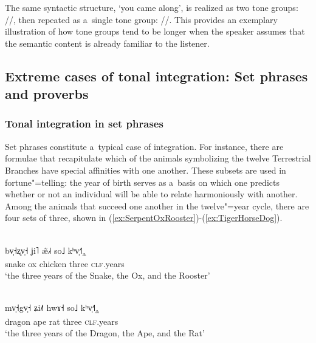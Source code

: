 The same syntactic structure, ‘you came along’, is realized as
two tone groups: //, then repeated as a~single tone group:
//. This provides an exemplary illustration of how tone groups tend to be longer when the speaker assumes that the semantic content is already familiar
to the listener.




\subsection[Extreme cases of tonal integration]{Extreme cases of tonal integration: Set phrases and proverbs}
\label{sec:extremecasesoftonalintegrationsetphrasesandproverbs}



\subsubsection{Tonal integration in set phrases}
\label{sec:tonalintegrationinsetphrases}

Set phrases constitute a~typical case of integration. For instance, there are formulae that recapitulate which of the animals symbolizing the twelve Terrestrial Branches have special affinities with one another. These subsets are used in fortune"=telling: the year of birth serves as a~basis on which one predicts whether or not an individual will be able to relate harmoniously with another. Among the animals that succeed one another in the twelve"=year cycle, there are four sets of three, shown in (\ref{ex:SerpentOxRooster})-(\ref{ex:TigerHorseDog}).

\begin{exe}
	\ex
	\label{ex:SerpentOxRooster}
	\\
	\gll bv̩˧ʐv̩˧	ʝi˥	æ̃˩˧	so˩		kʰv̩˧˥\textsubscript{a}\\
	snake		ox	chicken	three	\textsc{clf}.years\\
	\glt ‘the three years of the Snake, the Ox, and the Rooster’
\end{exe}

\begin{exe}
	\ex
	\label{ex:DragonApeRat}
	\\
	\gll mv̩˧gv̩˧	ʑi˩˥	hwɤ˧	so˩		kʰv̩˧˥\textsubscript{a}\\
	dragon		ape		rat		three	\textsc{clf}.years\\
	\glt ‘the three years of the Dragon, the Ape, and the Rat’
\end{exe}

